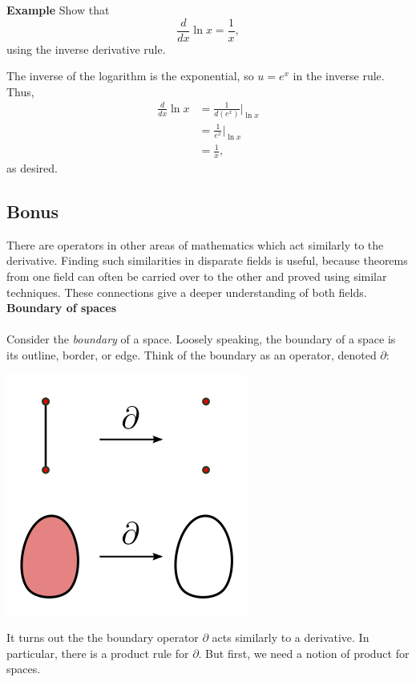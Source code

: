 \documentclass[twoside,openright,titlepage,a4paper]{book}
\begin{document}
\begin{sloppypar}
\textbf{Example} Show that \[ \frac{d}{dx} \ln x = \frac{1}{x}, \] using the inverse derivative rule. 
\begin{examplebox}
The inverse of the logarithm is the exponential, so $u = e^x$ in the inverse rule. Thus,
\begin{align*}
\frac{d}{dx} \ln x &= \frac{1}{d(e^x)} \bigg|_{\ln x} \\
&= \frac{1}{e^x} \bigg|_{\ln x} \\
&= \frac{1}{x},
\end{align*}
as desired.	
\end{examplebox}

\subsection{Bonus}
There are operators in other areas of mathematics which act similarly to the derivative. Finding such similarities in disparate fields is useful, because theorems from one field can often be carried over to the other and proved using similar techniques. These connections give a deeper understanding of both fields.
\bigbreak
\textbf{Boundary of spaces}\\\\

Consider the \textit{boundary} of a space. Loosely speaking, the boundary of a space is its outline, border, or edge. Think of the boundary as an operator, denoted $\partial$:
\begin{center}\includegraphics[scale=0.6]{Boundary}\end{center}

It turns out the the boundary operator $\partial$ acts similarly to a derivative. In particular, there is a product rule for $\partial$. But first, we need a notion of product for spaces.


\end{sloppypar}
\end{document}
